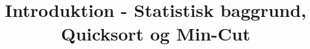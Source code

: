 
\title{Introduktion - Statistisk baggrund, Quicksort og Min-Cut}


\maketitle
\tableofcontents
\newpage


\newpage


\newpage



